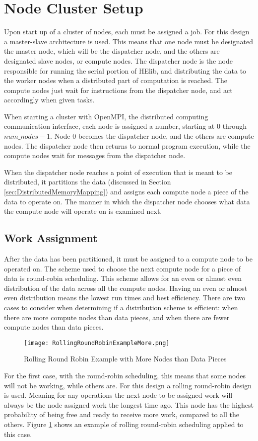 \section{Node Cluster Setup} \label{sec:NodeClusterSetup}
Upon start up of a cluster of nodes, each must be assigned a job. For this design a master-slave architecture is used. This means that one node must be designated the master node, which will be the dispatcher node, and the others are designated slave nodes, or compute nodes. The dispatcher node is the node responsible for running the serial portion of HElib, and distributing the data to the worker nodes when a distributed part of computation is reached. The compute nodes just wait for instructions from the dispatcher node, and act accordingly when given tasks.

When starting a cluster with OpenMPI, the distributed computing communication interface, each node is assigned a number, starting at $0$ through $num\_nodes - 1$. Node $0$ becomes the dispatcher node, and the others are compute nodes. The dispatcher node then returns to normal program execution, while the compute nodes wait for messages from the dispatcher node. 

When the dispatcher node reaches a point of execution that is meant to be distributed, it partitions the data (discussed in Section \ref{sec:DistributedMemoryMapping}) and assigns each compute node a piece of the data to operate on. The manner in which the dispatcher node chooses what data the compute node will operate on is examined next.

\subsection{Work Assignment}
After the data has been partitioned, it must be assigned to a compute node to be operated on. The scheme used to choose the next compute node for a piece of data is round-robin scheduling. This scheme allows for an even or almost even distribution of the data across all the compute nodes. Having an even or almost even distribution means the lowest run times and best efficiency. There are two cases to consider when determining if a distribution scheme is efficient: when there are more compute nodes than data pieces, and when there are fewer compute nodes than data pieces.

\begin{figure}[t!]
\centering
\texttt{[image: RollingRoundRobinExampleMore.png]}
\caption{Rolling Round Robin Example with More Nodes than Data Pieces}
\label{fig:RollingRoundRobinExampleMore}
\end{figure}
For the first case, with the round-robin scheduling, this means that some nodes will not be working, while others are. For this design a rolling round-robin design is used. Meaning for any operations the next node to be assigned work will always be the node assigned work the longest time ago. This node has the highest probability of being free and ready to receive more work, compared to all the others. Figure \ref{fig:RollingRoundRobinExampleMore} shows an example of rolling round-robin scheduling applied to this case.

